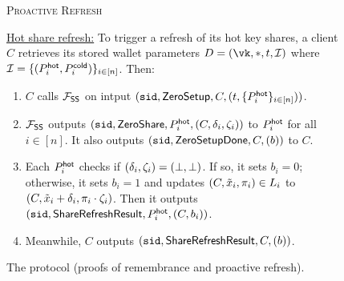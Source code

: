 \begin{figure*}
\begin{mdframed}
\begin{enumerate}
        \end{enumerate}
        \begin{center}
            \textsc{Proactive Refresh}
        \end{center}
        \underline{Hot share refresh:} To trigger a refresh of its hot key shares, a client $C$
        retrieves its stored wallet parameters $\clientlist = (\vk, *, t, \mathcal{I})$ where $\mathcal{I} = \{(P_i^{\mathsf{hot}}, P_i^{\mathsf{cold}})\}_{i \in [n]}$. Then:
        \begin{enumerate}
            \item $C$ calls $\mathcal{F}_\mathsf{SS}$ on intput $(\texttt{sid}, \mathsf{ZeroSetup}, C, (t, \{P_i^{\mathsf{hot}}\}_{i \in [n]}))$.
            \item $\mathcal{F}_\mathsf{SS}$ outputs $(\texttt{sid}, \mathsf{ZeroShare}, P_i^{\mathsf{hot}}, (C, \delta_i, \zeta_i))$ to $P_i^{\mathsf{hot}}$ for all $i \in [n]$. It also outputs $(\texttt{sid},\allowbreak \mathsf{ZeroSetupDone}, C, (b))$ to $C$.
            \item Each $P_i^{\mathsf{hot}}$ 
            checks if $(\delta_i, \zeta_i) = (\perp, \perp)$. If so, it sets $b_i = 0$; otherwise, it sets $b_i = 1$ and
            updates $(C, \tilde{x}_i, \pi_i) \in L_i$ to $(C, \tilde{x}_i + \delta_i,\allowbreak \pi_i \cdot \zeta_i)$. Then it outputs $(\texttt{sid}, \mathsf{ShareRefreshResult},\allowbreak P_i^{\mathsf{hot}}, (C, b_i))$.
            \item Meanwhile, $C$ outputs $(\texttt{sid}, \mathsf{ShareRefreshResult}, C, (b))$.
        \end{enumerate}
        \end{mdframed}
        \caption{The \sysname protocol (proofs of remembrance and proactive refresh).}
        \label{fig:hc_bls2}
    \end{figure*}